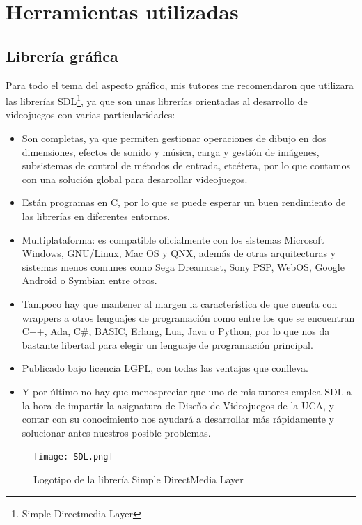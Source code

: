 \section{Herramientas utilizadas}

\subsection{Librería gráfica}

Para todo el tema del aspecto gráfico, mis tutores me recomendaron que utilizara las librerías SDL\footnote{Simple
Directmedia Layer}, ya que son unas librerías orientadas al desarrollo de videojuegos con varias particularidades:
\begin{itemize}
    \item Son completas, ya que permiten gestionar operaciones de dibujo en dos dimensiones, efectos de
            sonido y música, carga y gestión de imágenes, subsistemas de control de métodos de entrada,
            etcétera, por lo que contamos con una solución global para desarrollar videojuegos.
    \item Están programas en C, por lo que se puede esperar un buen rendimiento de las librerías en
            diferentes entornos.
    \item Multiplataforma: es compatible oficialmente con los sistemas Microsoft Windows, GNU/Linux,
            Mac OS y QNX, además de otras arquitecturas y sistemas menos comunes como Sega Dreamcast, Sony PSP,
            WebOS, Google Android o Symbian entre otros.
    \item Tampoco hay que mantener al margen la característica de que cuenta con wrappers a otros lenguajes
            de programación como entre los que se encuentran C++, Ada, C\#, BASIC, Erlang, Lua, Java o Python, por
            lo que nos da bastante libertad para elegir un lenguaje de programación principal.
    \item Publicado bajo licencia LGPL, con todas las ventajas que conlleva.
    \item Y por último no hay que menospreciar que uno de mis tutores emplea SDL a la hora de impartir la asignatura
            de Diseño de Videojuegos de la UCA, y contar con su conocimiento nos ayudará a desarrollar más rápidamente
            y solucionar antes nuestros posible problemas.
\end{itemize}

\begin{figure}[h]
  \begin{center}
    \texttt{[image: SDL.png]}
  \end{center}
  \caption{Logotipo de la librería Simple DirectMedia Layer}
  \label{logo-sdl}
\end{figure}

